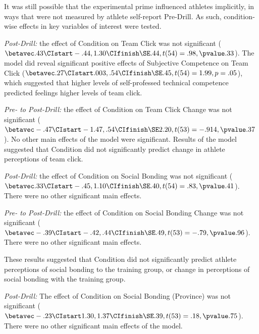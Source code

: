 \begin{CJK}{UTF8}{gbsn}
It was still possible that the experimental prime influenced athletes implicitly, in ways that were not measured by athlete self-report Pre-Drill.  As such, condition-wise effects in key variables of interest were tested.


\textit{Post-Drill:} the effect of Condition on Team Click was not significant ($\betavec .43 \CIstart -.44, 1.30 \CIfinish \SE .44, t(54)= .98, \pvalue .33$). The model did reveal significant positive effects of Subjective Competence on Team Click ($\betavec .27  \CIstart .003, .54 \CIfinish \SE .45, t(54)= 1.99, p = .05$), which suggested that higher levels of self-professed technical competence predicted feelings higher levels of team click.

\textit{Pre- to Post-Drill:} the effect of Condition on Team Click Change was not significant ($\betavec -.47 \CIstart -1.47, .54 \CIfinish \SE 2.20, t(53)= -.914, \pvalue .37$). No other main effects of the model were significant.  Results of the model suggested that Condition did not significantly predict change in athlete perceptions of team click.

\textit{Post-Drill:} the effect of Condition on Social Bonding was not significant
($\betavec .33 \CIstart -.45, 1.10 \CIfinish \SE .40, t(54)= .83, \pvalue .41$). There were no other significant main effects.

\textit{Pre- to Post-Drill:} the effect of Condition on Social Bonding Change was not significant ($\betavec -.39 \CIstart -.42, .44 \CIfinish \SE .49, t(53)= -.79, \pvalue .96$). There were no other significant main effects.

These results suggested that Condition did not significantly predict athlete perceptions of social bonding to the training group, or change in perceptions of social bonding with the training group.

\textit{Post-Drill:}
The effect of Condition on Social Bonding (Province) was not significant ($\betavec -.23 \CIstart 1.30, 1.37 \CIfinish \SE .39, t(53)= .18, \pvalue .75$). There were no other significant main effects of the model.


\end{CJK}
